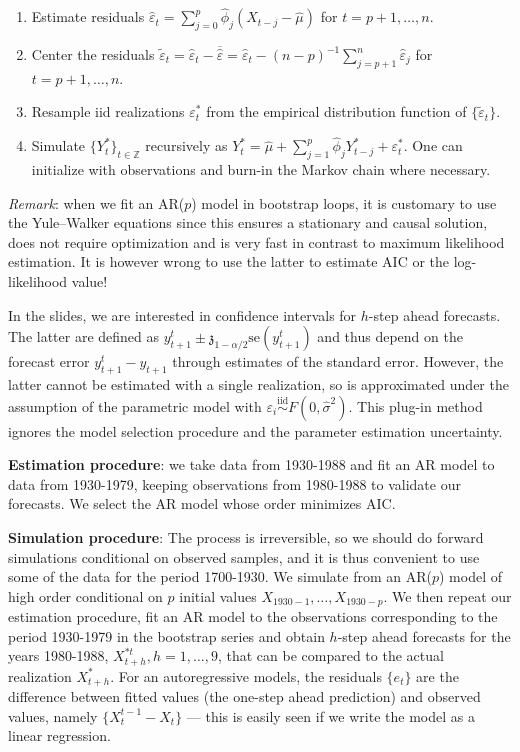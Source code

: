 \documentclass[]{book}
\providecommand{\tightlist}{%
  \setlength{\itemsep}{0pt}\setlength{\parskip}{0pt}}
\begin{document}
\begin{enumerate}
\def\labelenumi{\arabic{enumi}.}
\tightlist
\item
  Estimate residuals
  \(\widehat{\varepsilon}_t = \sum_{j=0}^p \widehat{\phi}_j (X_{t-j}-\widehat{\mu})\)
  for \(t=p+1, \ldots, n\).
\item
  Center the residuals
  \(\widetilde{\varepsilon}_t=\widehat{\varepsilon}_t-\overline{\widehat{\varepsilon}} = \widehat{\varepsilon}_t - (n-p)^{-1} \sum_{j=p+1}^n \widehat{\varepsilon}_j\)
  for \(t=p+1, \ldots, n\).
\item
  Resample iid realizations \(\varepsilon^*_t\) from the empirical
  distribution function of \(\{\widetilde{\varepsilon}_t\}\).
\item
  Simulate \(\{Y_t^*\}_{t\in \mathbb{Z}}\) recursively as
  \(Y_t^*=\widehat{\mu}+\sum_{j=1}^p\widehat{\phi}_jY_{t-j}^*+\varepsilon^*_t\).
  One can initialize with observations and burn-in the Markov chain
  where necessary.
\end{enumerate}

\emph{Remark}: when we fit an AR(\(p\)) model in bootstrap loops, it is
customary to use the Yule--Walker equations since this ensures a
stationary and causal solution, does not require optimization and is
very fast in contrast to maximum likelihood estimation. It is however
wrong to use the latter to estimate AIC or the log-likelihood value!

In the slides, we are interested in confidence intervals for \(h\)-step
ahead forecasts. The latter are defined as
\({y}_{t+1}^t\pm \mathfrak{z}_{1-\alpha/2}\mathrm{se}({y}_{t+1}^t)\) and
thus depend on the forecast error \(y_{t+1}^t-y_{t+1}\) through
estimates of the standard error. However, the latter cannot be estimated
with a single realization, so is approximated under the assumption of
the parametric model with
\(\varepsilon_i \stackrel{\mathrm{iid}}{\sim}F(0,\widehat{\sigma}^2)\).
This plug-in method ignores the model selection procedure and the
parameter estimation uncertainty.

\textbf{Estimation procedure}: we take data from 1930-1988 and fit an AR
model to data from 1930-1979, keeping observations from 1980-1988 to
validate our forecasts. We select the AR model whose order minimizes
AIC.

\textbf{Simulation procedure}: The process is irreversible, so we should
do forward simulations conditional on observed samples, and it is thus
convenient to use some of the data for the period 1700-1930. We simulate
from an AR(\(p\)) model of high order conditional on \(p\) initial
values \(X_{1930-1}, \ldots, X_{1930-p}\). We then repeat our estimation
procedure, fit an AR model to the observations corresponding to the
period 1930-1979 in the bootstrap series and obtain \(h\)-step ahead
forecasts for the years 1980-1988, \(X_{t+h}^{*t}, h=1, \ldots, 9\),
that can be compared to the actual realization \(X^{*}_{t+h}\). For an
autoregressive models, the residuals \(\{e_{t}\}\) are the difference
between fitted values (the one-step ahead prediction) and observed
values, namely \(\{X_{t}^{t-1}-X_{t}\}\) --- this is easily seen if we
write the model as a linear regression.
\end{document}
